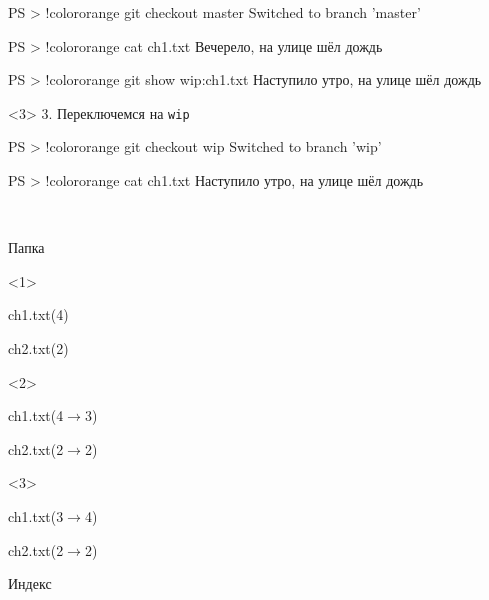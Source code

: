 \documentclass[9pt, aspectratio=1610]{beamer}
\begin{document}
\begin{frame}[t,fragile]
\begin{columns}[onlytextwidth]
\begin{column}[T]{\linewidth}
\begin{minipage}[t][5.2cm][t]{\textwidth}
\begin{onlyenv}
\begin{VerbatimCmd}[gobble=6]
						PS > !color{orange} git checkout master
						Switched to branch 'master'
						
						PS > !color{orange} cat ch1.txt
						Вечерело, на улице шёл дождь
						
						PS > !color{orange} git show wip:ch1.txt
						Наступило утро, на улице шёл дождь
						
					\end{VerbatimCmd}
					
				\end{onlyenv}
				
				
				\begin{onlyenv}<3>
					3. Переключемся на \Verb|wip|
					
					\begin{VerbatimCmd}[gobble=6]
						
						PS > !color{orange} git checkout wip    
						Switched to branch 'wip'
						
						PS > !color{orange} cat ch1.txt         
						Наступило утро, на улице шёл дождь
						
					\end{VerbatimCmd}
				\end{onlyenv}	
				
				
			\end{minipage}\\
			\begin{minipage}[t][3cm][t]{\linewidth}
				\begin{minipage}[t]{0.29\linewidth}
					\begin{exampleblock}{Папка\strut}  %
						
						\begin{onlyenv}<1>
							\strut ch1.txt(4)\rememb{a1}
							\strut ch2.txt(2)\rememb{b1}
						\end{onlyenv}
						
						\begin{onlyenv}<2>
							\strut ch1.txt(4$\to$3)\rememb{a3}
							\strut ch2.txt(2$\to$2)\rememb{b3}
						\end{onlyenv}
						
						\begin{onlyenv}<3>
							\strut ch1.txt(3$\to$4)
							\strut ch2.txt(2$\to$2)
						\end{onlyenv}
						
						
						
					\end{exampleblock}
				\end{minipage}\hfill%
				\begin{minipage}[t]{0.29\textwidth}
					\begin{exampleblock}{Индекс\strut}    %
						

\end{exampleblock}
\end{minipage}
\end{minipage}
\end{column}
\end{columns}
\end{frame}
\end{document}
